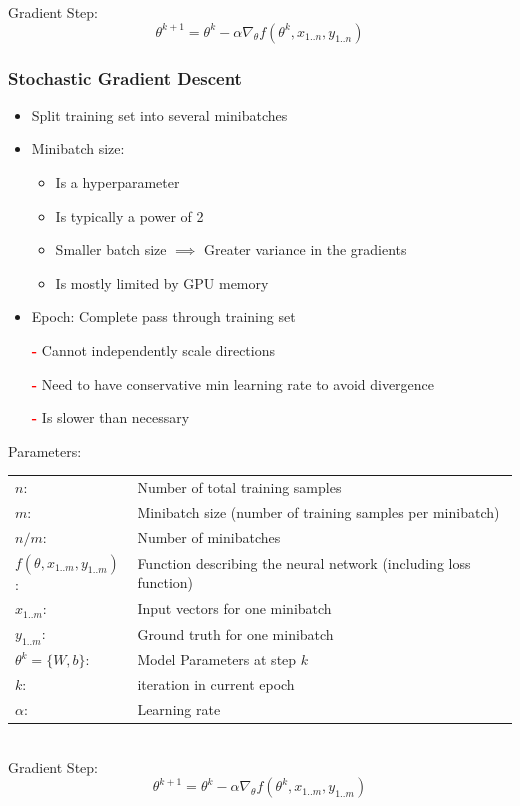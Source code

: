 \documentclass[10pt,a4paper]{article}
\newcommand{\cons}{\textcolor{red}{\textbf{-}}}
\begin{document}
Gradient Step:
$$
	\theta^{k + 1} = \theta^k - \alpha \nabla_\theta f(\theta^k, x_{1..n}, y_{1..n})
$$

\subsubsection{Stochastic Gradient Descent}
\begin{itemize}
	\item Split training set into several minibatches
	\item Minibatch size:
	\begin{itemize}
		\item Is a hyperparameter
		\item Is typically a power of 2
		\item Smaller batch size $\implies$ Greater variance in the gradients
		\item Is mostly limited by GPU memory
	\end{itemize}
	\item Epoch: Complete pass through training set
	\item[\cons] Cannot independently scale directions
	\item[\cons] Need to have conservative min learning rate to avoid divergence
	\item[\cons] Is slower than necessary
\end{itemize}

Parameters: \\
\begin{tabular}{ll}
	$n$: & Number of total training samples \\
	$m$: & Minibatch size (number of training samples per minibatch) \\
	$n/m$: & Number of minibatches \\
	$f(\theta, x_{1..m}, y_{1..m})$: & Function describing the neural network (including loss function) \\
	$x_{1..m}$: & Input vectors for one minibatch \\
	$y_{1..m}$: & Ground truth for one minibatch \\
	$\theta^k = \{W, b\}$: & Model Parameters at step $k$\\
	$k$: & iteration in current epoch \\
	$\alpha$: & Learning rate
\end{tabular} \\

Gradient Step:
$$
	\theta^{k + 1} = \theta^k - \alpha \nabla_\theta f(\theta^k, x_{1..m}, y_{1..m})
$$
\end{document}
